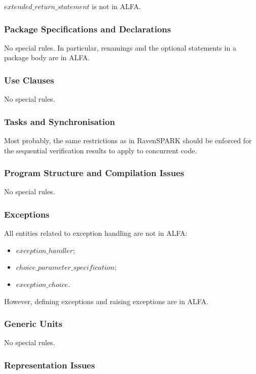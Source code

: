 \documentclass[fullpage]{article}
\newcommand{\bnf}[1]{$\mathit{#1}$}
\begin{document}
\bnf{extended\_return\_statement} is not in ALFA.

\subsubsection{Package Specifications and Declarations}

No special rules. In particular, renamings and the optional statements in a
package body are in ALFA.

\subsubsection{Use Clauses}

No special rules.

\subsubsection{Tasks and Synchronisation}

Most probably, the same restrictions as in RavenSPARK should be enforced for
the sequential verification results to apply to concurrent code.

\subsubsection{Program Structure and Compilation Issues}

No special rules.

\subsubsection{Exceptions}

All entities related to exception handling are not in ALFA:
\begin{itemize}
\item \bnf{exception\_handler};
\item \bnf{choice\_parameter\_specification};
\item \bnf{exception\_choice}.
\end{itemize}

However, defining exceptions and raising exceptions are in ALFA.

\subsubsection{Generic Units}

No special rules.

\subsubsection{Representation Issues}
\end{document}
